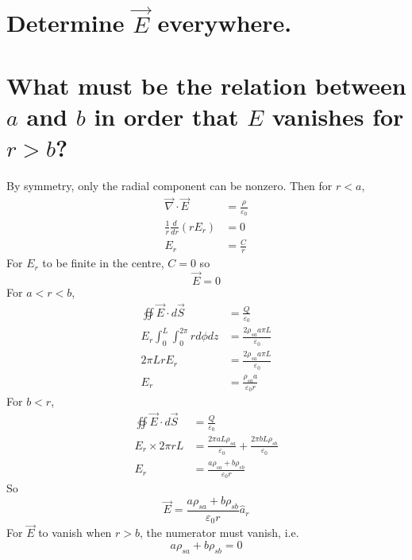 \documentclass[answers]{exam}
\begin{document}
\begin{questions}
\begin{parts}
	\part{Determine $\vec{E}$ everywhere.}
	\part{What must be the relation between $a$ and $b$ in order that $E$ vanishes for $r>b$?}
\end{parts}

\begin{solution}
	By symmetry, only the radial component can be nonzero. Then for $r<a$,
	\begin{align*}
		\vec{\nabla}\cdot\vec{E} &= \frac{\rho}{\varepsilon_0} \\
		\frac{1}{r}\frac{d}{dr}(rE_r) &= 0 \\
		E_r &= \frac{C}{r}
	\end{align*}
	For $E_r$ to be finite in the centre, $C=0$ so
	$$\vec{E} = 0$$
	For $a<r<b$,
	\begin{align*}
		\oiint \vec{E}\cdot d\vec{S} &= \frac{Q}{\varepsilon_0} \\
		E_r\int_0^L \int_0^{2\pi} rd\phi dz &= \frac{2\rho_{sa}a\pi L}{\varepsilon_0} \\
		2\pi LrE_r &= \frac{2\rho_{sa}a\pi L}{\varepsilon_0} \\
		E_r &= \frac{\rho_{sa}a}{\varepsilon_0r}
	\end{align*}
	For $b<r$,
	\begin{align*}
		\oiint\vec{E}\cdot d\vec{S} &= \frac{Q}{\varepsilon_0} \\
		E_r\times2\pi rL &= \frac{2\pi aL\rho_{sa}}{\varepsilon_0} + \frac{2\pi bL\rho_{sb}}{\varepsilon_0} \\
		E_r &= \frac{a\rho_{sa} + b\rho_{sb}}{\varepsilon_0r}
	\end{align*}
	So
	$$\vec{E} = \frac{a\rho_{sa} + b\rho_{sb}}{\varepsilon_0r}\hat{a}_r$$
	For $\vec{E}$ to vanish when $r>b$, the numerator must vanish, i.e.
	$$a\rho_{sa} + b\rho_{sb} = 0$$
\end{solution}



\end{questions}
\end{document}
